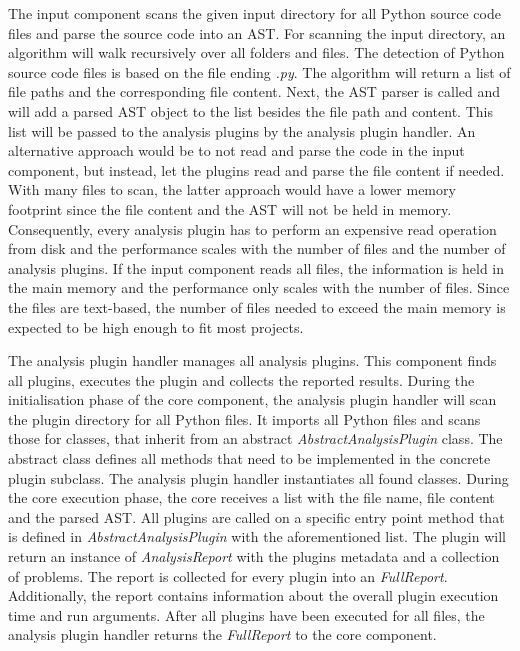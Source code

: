The input component scans the given input directory for all Python source code files and parse the source code into an AST. 
For scanning the input directory, an algorithm will walk recursively over all folders and files. The detection of Python source code files is based on the file ending \textit{.py}. The algorithm will return a list of file paths and the corresponding file content. 
Next, the AST parser is called and will add a parsed AST object to the list besides the file path and content. This list will be passed to the analysis plugins by the analysis plugin handler.  An alternative approach would be to not read and parse the code in the input component, but instead, let the plugins read and parse the file content if needed. With many files to scan, the latter approach would have a lower memory footprint since the file content and the AST will not be held in memory. Consequently, every analysis plugin has to perform an expensive read operation from disk and the performance scales with the number of files and the number of analysis plugins. 
If the input component reads all files, the information is held in the main memory and the performance only scales with the number of files. Since the files are text-based, the number of files needed to exceed the main memory is expected to be high enough to fit most projects.

The analysis plugin handler manages all analysis plugins. This component finds all plugins, executes the plugin and collects the reported results.
During the initialisation phase of the core component, the analysis plugin handler will scan the plugin directory for all Python files. It imports all Python files and scans those for classes, that inherit from an abstract \textit{AbstractAnalysisPlugin} class. The abstract class defines all methods that need to be implemented in the concrete plugin subclass. The analysis plugin handler instantiates all found classes.
During the core execution phase, the core receives a list with the file name, file content and the parsed AST. All plugins are called on a specific entry point method that is defined in \textit{AbstractAnalysisPlugin} with the aforementioned list. The plugin will return an instance of \textit{AnalysisReport} with the plugins metadata and a collection of problems. The report is collected for every plugin into an \textit{FullReport}. Additionally, the report contains information about the overall plugin execution time and run arguments. After all plugins have been executed for all files, the analysis plugin handler returns the \textit{FullReport} to the core component.

